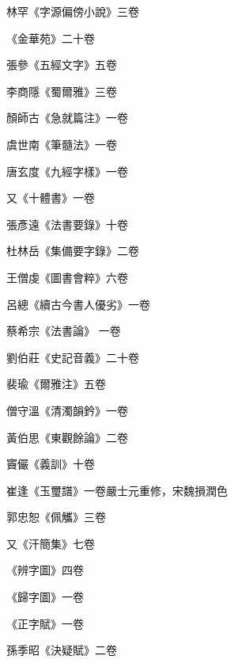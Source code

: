 \begin{pinyinscope}
 林罕《字源偏傍小說》三卷



 《金華苑》二十卷



 張參《五經文字》五卷



 李商隱《蜀爾雅》三卷



 顏師古《急就篇注》一卷



 虞世南《筆髓法》一卷



 唐玄度《九經字樣》一卷



 又《十體書》一卷



 張彥遠《法書要錄》十卷



 杜林岳《集備要字錄》二卷



 王僧虔《圖書會粹》六卷



 呂總《續古今書人優劣》一卷



 蔡希宗《法書論》
 一卷



 劉伯莊《史記音義》二十卷



 裴瑜《爾雅注》五卷



 僧守溫《清濁韻鈐》一卷



 黃伯思《東觀餘論》二卷



 竇儼《義訓》十卷



 崔逢《玉璽譜》一卷嚴士元重修，宋魏損潤色



 郭忠恕《佩觿》三卷



 又《汗簡集》七卷



 《辨字圖》四卷



 《歸字圖》一卷



 《正字賦》一卷



 孫季昭《決疑賦》二卷




\end{pinyinscope}
